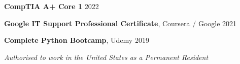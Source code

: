 \documentclass[11pt,letterpaper]{article}
\newcommand{\normalsizesection}{\normalsize}
\begin{document}
\vspace{-1pt}
\noindent\textbf{CompTIA A+ Core 1} \hfill 2022

\vspace{-1pt}
\noindent\textbf{Google IT Support Professional Certificate}, Coursera / Google \hfill 2021

\vspace{-1pt}
\noindent\textbf{Complete Python Bootcamp}, Udemy \hfill 2019

\normalsizesection

\vspace{3pt}
\begin{flushright}
\textit{Authorised to work in the United States as a Permanent Resident}
\end{flushright}
\end{document}
